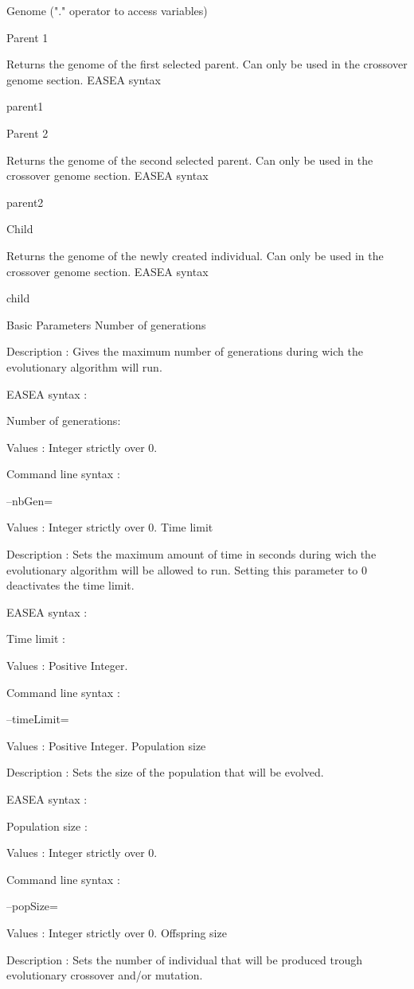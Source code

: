 \documentclass{article}
\begin{document}
Genome ("." operator to access variables)

Parent 1

Returns the genome of the first selected parent. Can only be used in the crossover genome section.
EASEA syntax

parent1

Parent 2

Returns the genome of the second selected parent. Can only be used in the crossover genome section.
EASEA syntax

parent2

Child

Returns the genome of the newly created individual. Can only be used in the crossover genome section.
EASEA syntax

child




Basic Parameters
Number of generations

Description :
Gives the maximum number of generations during wich the evolutionary algorithm will run.

EASEA syntax :

Number of generations:

Values : Integer strictly over 0.

Command line syntax :

--nbGen=

Values : Integer strictly over 0.
Time limit

Description :
Sets the maximum amount of time in seconds during wich the evolutionary algorithm will be allowed to run. Setting this parameter to 0 deactivates the time limit.

EASEA syntax :

Time limit :

Values : Positive Integer.

Command line syntax :

--timeLimit=

Values : Positive Integer.
Population size

Description :
Sets the size of the population that will be evolved.

EASEA syntax :

Population size :

Values : Integer strictly over 0.

Command line syntax :

--popSize=

Values : Integer strictly over 0.
Offspring size

Description :
Sets the number of individual that will be produced trough evolutionary crossover and/or mutation.
\end{document}
